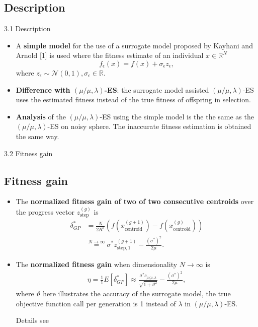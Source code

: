 \documentclass{beamer}
\begin{document}
\subsection{Description}
\begin{frame}{3.1 Description}

\begin{itemize}
\item A \textbf{simple model} for the use of a surrogate model proposed by Kayhani and Arnold [1] is used where the fitness estimate of an individual $x\in \mathbb{R}^N$ $$f_\epsilon(x) = f(x)+\sigma_\epsilon z_\epsilon,$$
where $z_\epsilon \sim \mathcal{N}(0,1), \sigma_\epsilon \in \mathbb{R}. $

\item \textbf{Difference with $(\mu/\mu,\lambda)$-ES}: the surrogate model assisted $(\mu/\mu,\lambda)$-ES uses the estimated fitness instead of the true fitness of offspring in selection. 

\item \textbf{Analysis} of the $(\mu/\mu,\lambda)$-ES using the simple model is the the same as the $(\mu/\mu,\lambda)$-ES on noisy sphere. The inaccurate fitness estimation is obtained the same way.
\end{itemize}


\end{frame}




\begin{frame}{3.2 Fitness gain}
\subsection{Fitness gain}
\begin{itemize}
    \item The \textbf{normalized fitness gain of two of two consecutive centroids} over the progress vector $z_{\text{step}}^{(g)}$ is
    \begin{align}
        \delta_{GP}^* &=  \frac{N}{2R^2}\left( f( x_{\text{centroid}}^{(g+1)} ) - f( x_{\text{centroid}}^{(g)} ) \right)  \nonumber\\ 
        &\overset{N \rightarrow \infty}{=} \sigma^* z_{\text{step},1}^{(g+1)}   - \frac{(\sigma^*)^2}{2 \mu}.\nonumber  
    \end{align}
    \item The \textbf{normalized fitness gain} when dimensionality $N \rightarrow \infty$ is 
    \begin{align}\label{eqn:eta_surrogate}{}
        \eta = \frac{1}{1}E[ \delta_{GP}^*] \approx  \frac{\sigma^* c_{\mu / \mu, \lambda}}{\sqrt {1+ \vartheta^2}} - \frac{(\sigma^*)^2}{2 \mu} ,\nonumber 
    \end{align}
    where $\vartheta$ here illustrates the accuracy of the surrogate model, the true objective function call per generation is 1 instead of $\lambda$ in $(\mu/\mu,\lambda)$-ES.
    
    Details see 
\end{itemize} 

\end{frame}
\end{document}
